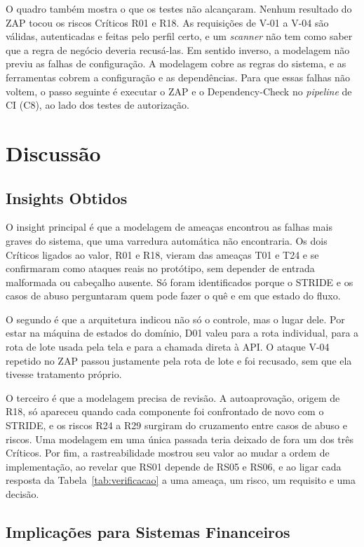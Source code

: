 \documentclass[conference]{IEEEtran}
\begin{document}
O quadro também mostra o que os testes não alcançaram. Nenhum resultado do ZAP tocou os riscos Críticos R01 e R18. As requisições de V-01 a V-04 são válidas, autenticadas e feitas pelo perfil certo, e um \textit{scanner} não tem como saber que a regra de negócio deveria recusá-las. Em sentido inverso, a modelagem não previu as falhas de configuração. A modelagem cobre as regras do sistema, e as ferramentas cobrem a configuração e as dependências. Para que essas falhas não voltem, o passo seguinte é executar o ZAP e o Dependency-Check no \textit{pipeline} de CI (C8), ao lado dos testes de autorização.

\section{Discussão}
\label{sec:discussao}

\subsection{Insights Obtidos}
\label{subsec:licoes}

O insight principal é que a modelagem de ameaças encontrou as falhas mais graves do sistema, que uma varredura automática não encontraria. Os dois Críticos ligados ao valor, R01 e R18, vieram das ameaças T01 e T24 e se confirmaram como ataques reais no protótipo, sem depender de entrada malformada ou cabeçalho ausente. Só foram identificados porque o STRIDE e os casos de abuso perguntaram quem pode fazer o quê e em que estado do fluxo.

O segundo é que a arquitetura indicou não só o controle, mas o lugar dele. Por estar na máquina de estados do domínio, D01 valeu para a rota individual, para a rota de lote usada pela tela e para a chamada direta à API. O ataque V-04 repetido no ZAP passou justamente pela rota de lote e foi recusado, sem que ela tivesse tratamento próprio.

O terceiro é que a modelagem precisa de revisão. A autoaprovação, origem de R18, só apareceu quando cada componente foi confrontado de novo com o STRIDE, e os riscos R24 a R29 surgiram do cruzamento entre casos de abuso e riscos. Uma modelagem em uma única passada teria deixado de fora um dos três Críticos. Por fim, a rastreabilidade mostrou seu valor ao mudar a ordem de implementação, ao revelar que RS01 depende de RS05 e RS06, e ao ligar cada resposta da Tabela~\ref{tab:verificacao} a uma ameaça, um risco, um requisito e uma decisão.

\subsection{Implicações para Sistemas Financeiros}
\label{subsec:implicacoes}
\end{document}
